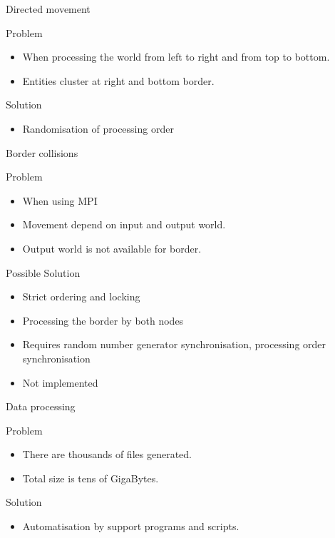 \documentclass{beamer}
\begin{document}
\begin{frame}{Directed movement}
    \begin{block}{Problem}
        \begin{itemize}
            \item When processing the world from left to right and from top to bottom.
            \item Entities cluster at right and bottom border.
        \end{itemize}
    \end{block}
    \begin{block}{Solution}
        \begin{itemize}
            \item Randomisation of processing order
        \end{itemize}
    \end{block}
\end{frame}

\begin{frame}{Border collisions}
    \begin{block}{Problem}
        \begin{itemize}
            \item When using MPI
            \item Movement depend on input and output world.
            \item Output world is not available for border.
        \end{itemize}
    \end{block}
    \begin{block}{Possible Solution}
        \begin{itemize}
            \item Strict ordering and locking
            \item Processing the border by both nodes
            \item Requires random number generator synchronisation, processing order synchronisation
            \item Not implemented
        \end{itemize} 
    \end{block}
\end{frame}

\begin{frame}{Data processing}
    \begin{block}{Problem}
        \begin{itemize}
            \item There are thousands of files generated.
            \item Total size is tens of GigaBytes.
        \end{itemize}
    \end{block}
    \begin{block}{Solution}
        \begin{itemize}
            \item Automatisation by support programs and scripts.
        \end{itemize}
    \end{block}
\end{frame}
\end{document}
